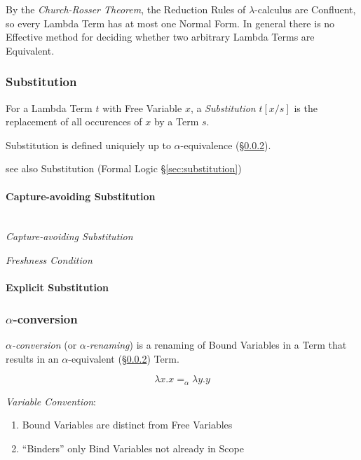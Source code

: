 By the \emph{Church-Rosser Theorem}, the Reduction Rules of
$\lambda$-calculus are Confluent, so every Lambda Term has at most one
Normal Form. In general there is no Effective method for deciding
whether two arbitrary Lambda Terms are Equivalent.




\subsubsection{Substitution}\label{sec:lambda_substitution}

For a Lambda Term $t$ with Free Variable $x$, a \emph{Substitution}
$t[x/s]$ is the replacement of all occurences of $x$ by a Term $s$.

Substitution is defined uniquiely up to $\alpha$-equivalence
(\S\ref{sec:alpha_conversion}).

see also Substitution (Formal Logic \S\ref{sec:substitution})



\paragraph{Capture-avoiding Substitution}\label{sec:capture_avoiding}
\hfill \\

\emph{Capture-avoiding Substitution}

\emph{Freshness Condition}



\paragraph{Explicit Substitution}\label{sec:explicit_substitution}



\subsubsection{$\alpha$-conversion}\label{sec:alpha_conversion}

\emph{$\alpha$-conversion} (or \emph{$\alpha$-renaming}) is a renaming
of Bound Variables in a Term that results in an $\alpha$-equivalent
(\S\ref{sec:alpha_conversion}) Term.

\[
  \lambda x.x =_\alpha \lambda y.y
\]

\emph{Variable Convention}:
\begin{enumerate}
  \item Bound Variables are distinct from Free Variables
  \item ``Binders'' only Bind Variables not already in Scope %
\end{enumerate}

